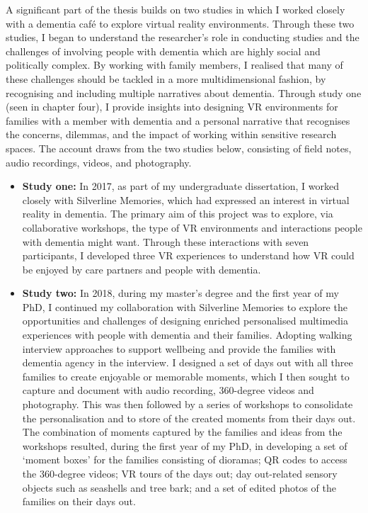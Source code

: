 A significant part of the thesis builds on two studies in which I worked closely with a dementia café to explore virtual reality environments. Through these two studies, I began to understand the researcher's role in conducting studies and the challenges of involving people with dementia which are highly social and politically complex. By working with family members, I realised that many of these challenges should be tackled in a more multidimensional fashion, by recognising and including multiple narratives about dementia. 
Through study one (seen in chapter four), I provide insights into designing VR environments for families with a member with dementia and a personal narrative that recognises the concerns, dilemmas, and the impact of working within sensitive research spaces. The account draws from the two studies below, consisting of field notes, audio recordings, videos, and photography. 
\begin{itemize}
    \item \textbf{Study one:} In 2017, as part of my undergraduate dissertation, I worked closely with Silverline Memories, which had expressed an interest in virtual reality in dementia. The primary aim of this project was to explore, via collaborative workshops, the type of VR environments and interactions people with dementia might want. Through these interactions with seven participants, I developed three VR experiences to understand how VR could be enjoyed by care partners and people with dementia.

    \item \textbf{Study two:} In 2018, during my master's degree and the first year of my PhD, I continued my collaboration with Silverline Memories to explore the opportunities and challenges of designing enriched personalised multimedia experiences with people with dementia and their families. Adopting walking interview approaches to support wellbeing and provide the families with dementia agency in the interview. I designed a set of days out with all three families to create enjoyable or memorable moments, which I then sought to capture and document with audio recording, 360-degree videos and photography. This was then followed by a series of workshops to consolidate the personalisation and to store of the created moments from their days out. The combination of moments captured by the families and ideas from the workshops resulted, during the first year of my PhD, in developing a set of `moment boxes' for the families consisting of dioramas; QR codes to access the 360-degree videos; VR tours of the days out; day out-related sensory objects such as seashells and tree bark; and a set of edited photos of the families on their days out.

\end{itemize}

